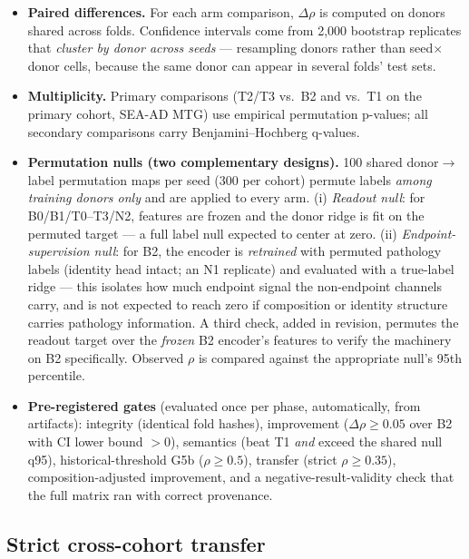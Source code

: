 \documentclass[11pt]{article}
\begin{document}
\begin{itemize}
  \item \textbf{Paired differences.} For each arm comparison, $\Delta\rho$
    is computed on donors shared across folds. Confidence intervals come
    from 2{,}000 bootstrap replicates that \emph{cluster by donor across
    seeds} --- resampling donors rather than seed$\times$donor cells,
    because the same donor can appear in several folds' test sets.
  \item \textbf{Multiplicity.} Primary comparisons (T2/T3 vs.\ B2 and
    vs.\ T1 on the primary cohort, SEA-AD MTG) use empirical
    permutation p-values; all secondary comparisons carry
    Benjamini--Hochberg q-values.
  \item \textbf{Permutation nulls (two complementary designs).} 100
    shared donor$\to$label permutation maps per seed (300 per cohort)
    permute labels \emph{among training donors only} and are applied to
    every arm. (i) \emph{Readout null}: for B0/B1/T0--T3/N2, features
    are frozen and the donor ridge is fit on the permuted target ---
    a full label null expected to center at zero. (ii)
    \emph{Endpoint-supervision null}: for B2, the encoder is
    \emph{retrained} with permuted pathology labels (identity head
    intact; an N1 replicate) and evaluated with a true-label ridge ---
    this isolates how much endpoint signal the non-endpoint channels
    carry, and is not expected to reach zero if composition or identity
    structure carries pathology information. A third check, added in
    revision, permutes the readout target over the \emph{frozen} B2
    encoder's features to verify the machinery on B2 specifically.
    Observed $\rho$ is compared against the appropriate null's 95th
    percentile.
  \item \textbf{Pre-registered gates} (evaluated once per phase,
    automatically, from artifacts): integrity (identical fold hashes),
    improvement ($\Delta\rho\geq0.05$ over B2 with CI lower bound $>0$),
    semantics (beat T1 \emph{and} exceed the shared null q95),
    historical-threshold G5b ($\rho\geq0.5$), transfer (strict $\rho\geq
    0.35$), composition-adjusted improvement, and a
    negative-result-validity check that the full matrix ran with correct
    provenance.
\end{itemize}

\subsection{Strict cross-cohort transfer}
\label{sec:transfer_methods}
\end{document}

